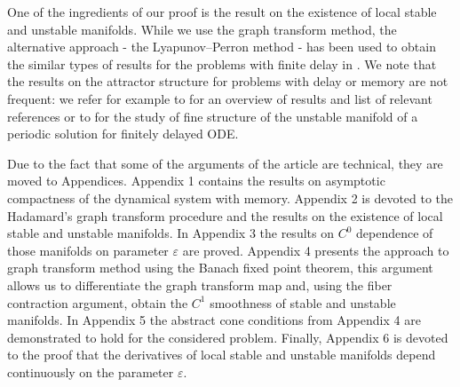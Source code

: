 \documentclass[11pt, leqno]{amsart}
\theoremstyle{definition}
\begin{document}
   One of the ingredients of our proof is the result on the existence of local stable and unstable manifolds. While we use the graph transform method, the alternative approach - the Lyapunov--Perron method - has been used to obtain the similar types of results for the problems with finite delay  in \cite{Krisztin}. We note that the results on the attractor structure for problems with delay or memory are not frequent:  we refer for example to \cite{Walther} for an overview of results and list of relevant references or to \cite{KV} for the study of fine structure of the unstable manifold of a periodic solution for finitely delayed ODE.



Due to the fact that some of the arguments of the article are  technical, they are moved to Appendices. Appendix 1 contains the results on asymptotic compactness of the dynamical system with memory. Appendix 2 is devoted to the Hadamard's graph transform procedure and the results on the existence of local stable and unstable manifolds. In Appendix 3 the results on $C^0$ dependence of those manifolds on parameter $\varepsilon$ are proved. Appendix 4 presents the approach to graph transform method using the Banach fixed point theorem, this argument allows us to differentiate the graph transform map and, using the fiber contraction argument,  obtain the $C^1$ smoothness of stable and unstable manifolds. In Appendix 5 the abstract cone conditions from Appendix 4 are demonstrated to hold  for the considered problem.   Finally, Appendix 6 is devoted to the proof that the derivatives of local stable and unstable manifolds depend continuously on the parameter $\varepsilon$.
%
\end{document}
